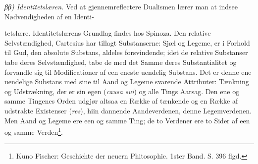 \documentclass[12pt,a4paper]{book}
\begin{document}

\emph{ββ) Identitetslæren.} Ved at gjennemreflectere Dualismen lærer man at
indsee Nødvendigheden af en Identi-

\setcounter{footnote}{0}
tetslære. Identitetslærens Grundlag findes hos Spinoza. Den relative
Selvstændighed, Cartesius har tillagt Substanserne: Sjæl og Legeme, er i Forhold
til Gud, den absolute Substans, aldeles forsvindende; idet de relative Substanser
tabe deres Selvstændighed, tabe de med det Samme deres Substantialitet og
forvandle sig til Modificationer af een eneste uendelig Substans. Det er denne
ene uendelige Substans med sine til Aand og Legeme svarende Attributer: Tænkning
og Udstrækning, der er sin egen (\textit{causa sui}) og alle Tings Aarsag. Den
ene og samme Tingenes Orden udgjør altsaa en Række af tænkende og en Række af
udstrakte Existenser (\textit{res}), hiin dannende Aandeverdenen, denne
Legemverdenen. Men Aand og Legeme ere een og samme Ting; de to Verdener ere to
Sider af een og samme Verden\footnote{Kuno Fischer: Geschichte der neuern
Phitosophie. 1ster Band. S. 396 flgd.}.
\end{document}
